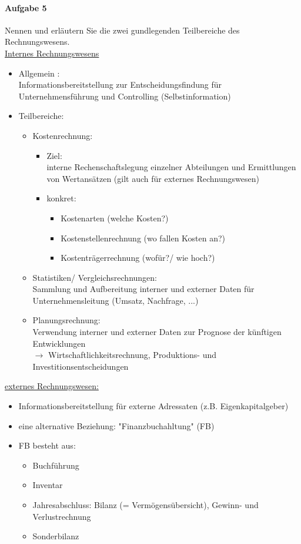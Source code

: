 \documentclass[paper=a4, fontsize=11pt]{scrartcl}
\numberwithin{equation}{section}
\numberwithin{figure}{section}
\numberwithin{table}{section}
\begin{document}
\paragraph{Aufgabe 5}
Nennen und erläutern Sie die zwei gundlegenden Teilbereiche des Rechnungswesens. \\

\underline{Internes Rechnungswesens}
\begin{itemize}
  \item Allgemein :\\
  Informationsbereitstellung zur Entscheidungsfindung für Unternehmensführung und
  Controlling (Selbstinformation)
  \item Teilbereiche:
  \begin{itemize}
    \item Kostenrechnung:
    \begin{itemize}
      \item Ziel: \\
      interne Rechenschaftslegung einzelner Abteilungen und Ermittlungen von Wertansätzen
      (gilt auch für externes Rechnungswesen)
      \item konkret:
      \begin{itemize}
        \item Kostenarten (welche Kosten?)
        \item Kostenstellenrechnung (wo fallen Kosten an?)
        \item Kostenträgerrechnung (wofür?/ wie hoch?)
      \end{itemize}
    \end{itemize}
    \item Statistiken/ Vergleichsrechnungen: \\
    Sammlung und Aufbereitung interner und externer Daten für
    Unternehmensleitung (Umsatz, Nachfrage, ...)
    \item Planungsrechnung: \\
    Verwendung interner und externer Daten zur Prognose der künftigen Entwicklungen \\
    $\rightarrow$ Wirtschaftlichkeitsrechnung, Produktions- und Investitionsentscheidungen
  \end{itemize}
\end{itemize}

\underline{externes Rechnungswesen:}

\begin{itemize}
  \item Informationsbereitstellung für externe Adressaten (z.B. Eigenkapitalgeber)
  \item eine alternative Beziehung: "Finanzbuchahltung" (FB)
  \item FB besteht aus:
  \begin{itemize}
    \item Buchführung
    \item Inventar
    \item Jahresabschluss: Bilanz (= Vermögensübersicht), Gewinn- und Verlustrechnung
    \item Sonderbilanz
  \end{itemize}
\end{itemize}
\end{document}
